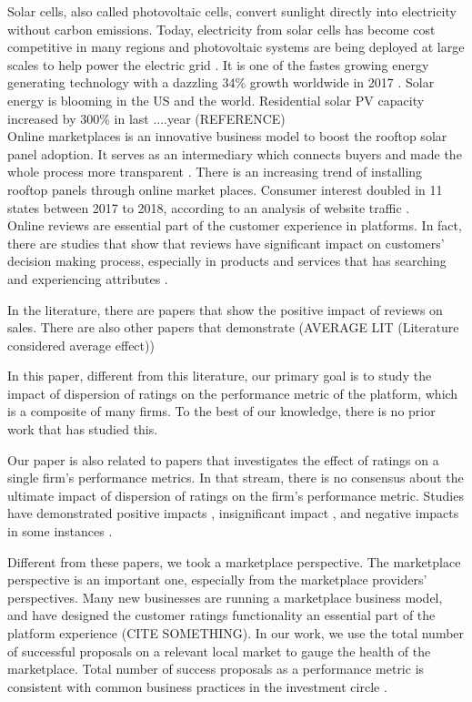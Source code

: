 \documentclass[msom,blindrev]{informs3}
\begin{document}
Solar cells, also called photovoltaic cells, convert sunlight directly into electricity without carbon emissions. Today, electricity from solar cells has become cost competitive in many regions and photovoltaic systems are being deployed at large scales to help power the electric grid \citep{nrel.gov}. 
It is one of the fastes growing energy generating technology with a dazzling 34\% growth worldwide in 2017  \citep{iea2018snapshot}. 
Solar energy is blooming in the US and the world. Residential solar PV capacity increased by 300\%  in last ....year (REFERENCE)\\ 
Online marketplaces is an innovative business model to boost the rooftop solar panel adoption. It serves as an intermediary which connects buyers and made the whole process more transparent \citep{dorsey2019access}. There is an increasing trend of installing rooftop panels through online market places. Consumer interest doubled in 11 states between 2017 to 2018, according to an analysis of  website traffic \citep{energysageintel19}.  \\
Online reviews are essential part of the customer experience in platforms. In fact, there are studies that show that reviews have significant impact on customers'  decision making process, especially in products and services that has searching and experiencing attributes \citep{zimmermann2018decomposing}. 


In the literature, there are papers that show the positive impact of reviews on sales. There are also other papers that demonstrate  (AVERAGE LIT (Literature considered average effect))

In this paper, different from this literature, our primary goal is to study the impact of dispersion of ratings on the  performance metric of the platform, which is a composite of many firms. To the best of our knowledge, there is no prior work that has studied this. 

Our paper is also related to papers that investigates the effect of ratings on a single firm's performance metrics. In that stream, there is no consensus about the ultimate impact of dispersion of ratings on the firm's performance metric. Studies have demonstrated positive impacts \citep{chintagunta2010effects,chevalier2006effect,dellarocas2007exploring}, insignificant impact \citep{duan2008online}, and negative impacts in some instances \citep{wang2015user}. 

Different from these papers, we took a marketplace perspective. The marketplace perspective is an important one, especially from the marketplace providers' perspectives. Many new businesses are running a marketplace business model, and have designed the customer ratings functionality an essential part of the platform experience (CITE SOMETHING). In our work, we use the total number of successful proposals on a relevant local market to gauge the health of the marketplace. Total number of success proposals as a performance metric is consistent with common business practices in the investment circle \citep{boris_2018,galston_2017}. 
\end{document}
